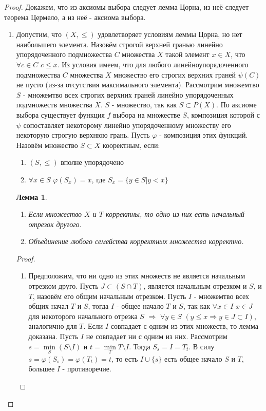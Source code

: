\documentclass[a4paper, 12pt]{article}
\renewcommand{\phi}{\varphi}
\theoremstyle{definition}
\theoremstyle{plain}
\newtheorem*{lemma}{Лемма}
\theoremstyle{remark}
\begin{document}
  \begin{proof}
    Докажем, что из аксиомы выбора следует лемма Цорна, из неё следует теорема Цермело, а из неё - аксиома выбора.
    \begin{enumerate}
      \item Допустим, что $(X,\leqslant)$ удовлетворяет условиям леммы Цорна, но нет наибольшего элемента. Назовём строгой верхней гранью линейно упорядоченного подмножества $C$ множества $X$ такой элемент $x\in X$, что $\forall c\in C$ $c\leqslant x$. Из условия имеем, что для любого линейноупорядоченного подмножества $C$ множества $X$ множество его строгих верхних граней $\psi(C)$ не пусто (из-за отсутствия максимального элемента). Рассмотрим множемтво $S$ - множемтво всех строгих верхних граней линейно упорядоченных подмножеств множества $X$. $S$ - множество, так как $S\subset P(X)$. По аксиоме выбора существует функция $f$ выбора на множестве $S$, композиция которой с $\psi$ сопоставляет некоторому линейно упорядоченному множеству его некоторую строгую верхнюю грань. Пусть $\phi$ - композиция этих функций.\\
      Назовём множество $S\subset X$ кооректным, если:\begin{enumerate}
        \item $(S,\leqslant)$ вполне упорядочено
        \item $\forall x\in S$ $\phi(S_x) = x$, где $S_x=\{y\in S|y<x\}$
      \end{enumerate}
      \begin{lemma}
        \begin{enumerate}
          \item Если множество $X$ и $T$ корректны, то одно из них есть начальный отрезок другого.
          \item Объединение любого семейства корректных множества корректно.
        \end{enumerate}
      \end{lemma}
      \begin{proof}
        \begin{enumerate}
          \item Предположим, что ни одно из этих множеств не является начальным отрезком друго. Пусть $J\subset (S\cap T)$, является начальным отрезком и $S$, и $T$, назовём его общим начальным отрезком. Пусть $I$ - множемтво всех общих начал $T$ и $S$, тогда $I$ - общее начало $T$ и $S$, так как $\forall x\in I$ $x\in J$ для некоторого начального отрезка $S$ $\Longrightarrow$ $\forall y\in S$ $(y\leqslant x\Longrightarrow y\in J\subset I)$, аналогично для $T$. Если $I$ совпадает с одним из этих множеств, то лемма доказана. Пусть $I$ не совпадает ни с одним из них. Рассмотрим $s=\min\limits_S(S\setminus I)$ и $t=\min\limits_T{T\setminus I}$. Тогда $S_s=I=T_t$. В силу $s=\phi(S_s)=\phi(T_t)=t$, то есть $I\cup\{s\}$ есть общее начало $S$ и $T$, большее $I$ - противоречие.

\end{enumerate}
\end{proof}
\end{enumerate}
\end{proof}
\end{document}
